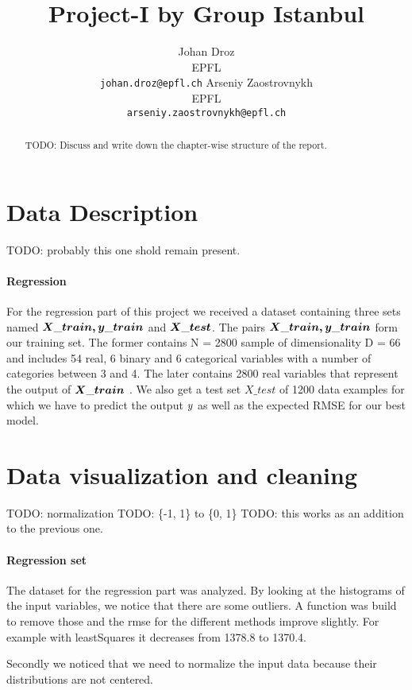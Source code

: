 \documentclass{article} %
\title{Project-I by Group Istanbul}
\author{
Johan Droz\\
EPFL \\
\texttt{johan.droz@epfl.ch} \And
Arseniy Zaostrovnykh\\
EPFL \\
\texttt{arseniy.zaostrovnykh@epfl.ch}
}
\newcommand{\todo}[1]{}
\renewcommand{\todo}[1]{{\color{red} TODO: {#1}}}
\begin{document}
\maketitle

\begin{abstract}
\todo{Discuss and write down the chapter-wise structure of the report.}

\end{abstract}

\section{Data Description}
\todo{probably this one shold remain present.}
\paragraph{Regression} For the regression part of this project we received a dataset containing three sets named $\boldmath{X\_train, y\_train}$ and $\boldmath{X\_test}$. The pairs $\boldmath{X\_train, y\_train}$  form our training set. 
The former contains N = 2800 sample of dimensionality D = 66 and includes 54 real, 6 binary and 6 categorical variables with a number of categories between 3 and 4.
The later contains 2800 real variables that represent the output of $\boldmath{X\_train}$ .
We also get a test set $X\_test$ of 1200 data examples for which we have to predict the output $\boldmath{y}$ as well as the expected RMSE for our best model.

\section{Data visualization and cleaning}
\todo{normalization}
\todo{\{-1, 1\} to \{0, 1\}}
\todo{this works as an addition to the previous one.}
\paragraph{Regression set} The dataset for the regression part was analyzed.
By looking at the histograms of the input variables, we notice that there are some outliers. A function was build to remove those and the rmse for the different methods improve slightly.
For example with leastSquares it decreases from 1378.8 to 1370.4.

Secondly we noticed that we need to normalize the input data because their distributions are not centered.
\end{document}
